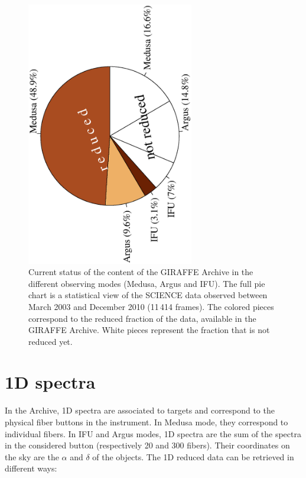 \documentclass[11pt,twoside]{article}
\begin{document}
\begin{figure}[!ht]
\begin{center}
    \includegraphics[angle=-90,width=0.65\textwidth]{P63_f1.eps}
\end{center}
\caption{Current status of the content of the GIRAFFE Archive in the different observing modes (Medusa, Argus and IFU). The full pie chart is a statistical view of the SCIENCE data observed between March 2003 and December 2010 (11\,414 frames). The colored pieces correspond to the reduced fraction of the data, available in the GIRAFFE Archive. White pieces represent the fraction that is not reduced yet.
}
\label{camembert}
\end{figure}


\section{1D spectra}

In the Archive, 1D spectra are associated to targets and correspond to the physical fiber buttons in the instrument. In Medusa mode, they correspond to individual fibers. In IFU and Argus modes, 1D spectra are the sum of the spectra in the considered button (respectively 20 and 300 fibers). Their coordinates on the sky are the $\alpha$ and $\delta$ of the objects. The 1D reduced data can be retrieved in different ways:
\end{document}
